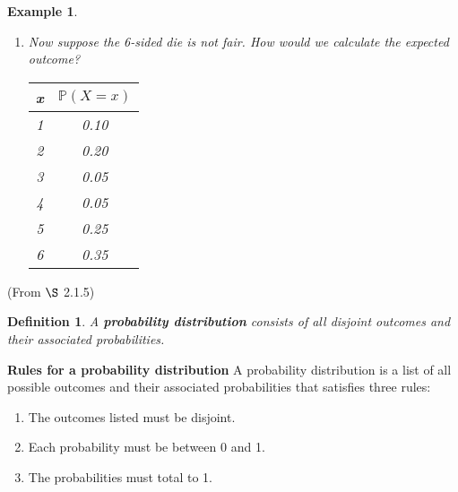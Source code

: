 \documentclass[12pt]{amsart}
\newtheorem{definition}[theorem]{Definition}
\newtheorem{example}[theorem]{Example}
\begin{document}
{\begin{example}
\begin{enumerate}
\item Now suppose the 6-sided die is not fair. How would we calculate the expected outcome?

\vspace{1cm}
\begin{tabular}{| c | c |}
  \hline                       
  x & $\mathbb{P}(X=x)$  \\
   \hline     
  1 & 0.10 \\
  2 & 0.20  \\
  3 & 0.05  \\
  4 & 0.05  \\
  5 & 0.25  \\
  6 & 0.35  \\
  \hline  
\end{tabular}

%

\vspace{2cm}
\end{enumerate}
\end{example} 

\newpage


(From $\S$ 2.1.5)
\begin{definition} A \textbf{probability distribution} consists of all disjoint outcomes and their associated probabilities.
\end{definition}

\textbf{Rules for a probability distribution} \newline
A probability distribution is a list of all possible outcomes and their associated probabilities that satisfies three rules: 
\begin{enumerate}
\setlength{\itemsep}{0mm}
\item The outcomes listed must be disjoint.
\item Each probability must be between 0 and 1.
\item The probabilities must total to 1. \vspace{1mm}
\end{enumerate}

}
\end{document}
